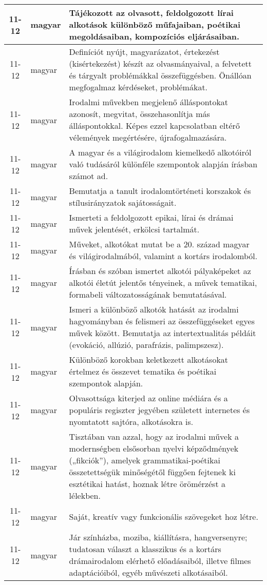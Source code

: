 \begin{small}
\begin{longtable}{c | p{2cm} |  p{11cm} }
              11-12 & magyar & Tájékozott az olvasott, feldolgozott lírai alkotások különböző műfajaiban, poétikai megoldásaiban, kompozíciós eljárásaiban. \\ \hline
              11-12 & magyar & Definíciót nyújt, magyarázatot, értekezést (kisértekezést) készít az olvasmányaival, a felvetett  és tárgyalt problémákkal összefüggésben. Önállóan megfogalmaz kérdéseket, problémákat. \\ \hline
              11-12 & magyar & Irodalmi művekben megjelenő álláspontokat azonosít, megvitat, összehasonlítja más álláspontokkal. Képes ezzel kapcsolatban eltérő vélemények megértésére, újrafogalmazására. \\ \hline
              11-12 & magyar & A magyar és a világirodalom kiemelkedő alkotóiról való tudásáról különféle szempontok alapján írásban számot ad.
 \\ \hline
              11-12 & magyar & Bemutatja a tanult irodalomtörténeti korszakok és stílusirányzatok sajátosságait. \\ \hline
              11-12 & magyar & Ismerteti a feldolgozott epikai, lírai és drámai művek jelentését, erkölcsi tartalmát. \\ \hline
              11-12 & magyar & Műveket, alkotókat mutat be a 20. század magyar és világirodalmából, valamint a kortárs irodalomból. \\ \hline
              11-12 & magyar & Írásban és szóban ismertet alkotói pályaképeket az alkotói életút jelentős tényeinek, a művek tematikai, formabeli változatosságának bemutatásával. \\ \hline
              11-12 & magyar & Ismeri a különböző alkotók hatását az irodalmi hagyományban és felismeri az összefüggéseket egyes művek között. Bemutatja az intertextualitás példáit (evokáció, allúzió, parafrázis, palimpszesz). \\ \hline
              11-12 & magyar & Különböző korokban keletkezett alkotásokat értelmez és összevet tematika és poétikai szempontok alapján. \\ \hline
              11-12 & magyar & Olvasottsága kiterjed az online médiára és a populáris regiszter jegyében született internetes és nyomtatott sajtóra, alkotásokra is. \\ \hline
              11-12 & magyar & Tisztában van azzal, hogy az irodalmi művek a modernségben elsősorban nyelvi képződmények („fikciók”), amelyek grammatikai-poétikai összetettségük minőségétől függően fejtenek ki esztétikai hatást, hoznak létre örömérzést a lélekben. \\ \hline
              11-12 & magyar & Saját, kreatív vagy funkcionális szövegeket hoz létre. \\ \hline
              11-12 & magyar & Jár színházba, moziba, kiállításra, hangversenyre; tudatosan választ a klasszikus és a kortárs drámairodalom elérhető előadásaiból, illetve filmes adaptációiból, egyéb művészeti alkotásaiból. \\ \hline
      \end{longtable}
\end{small}






